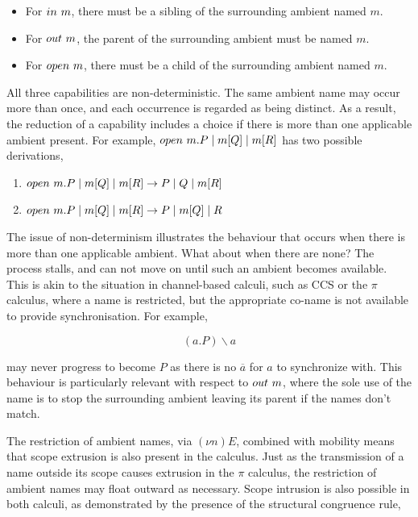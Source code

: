 \begin{itemize}
\item For $in\ m$, there must be a sibling of the surrounding
ambient named $m$.
\item For $out\ m$, the parent of the surrounding ambient must be
named $m$.
\item For $open\ m$, there must be a child of the surrounding
  ambient named $m$.
\end{itemize}

All three capabilities are non-deterministic.  The same ambient name
may occur more than once, and each occurrence is regarded as being
distinct.  As a result, the reduction of a capability includes a
choice if there is more than one applicable ambient present.  For
example, $open\ m.P \;|\; m[Q] \;|\; m[R]$ has two possible
derivations,

\begin{enumerate}
\item $open\ m.P \;|\; m[Q] \;|\; m[R] \rightarrow P \;|\; Q \;|\; m[R]$
\item $open\ m.P \;|\; m[Q] \;|\; m[R] \rightarrow P \;|\; m[Q] \;|\; R$
\end{enumerate}

The issue of non-determinism illustrates the behaviour that occurs when
there is more than one applicable ambient.  What about when there are
none?  The process stalls, and can not move on until such an ambient
becomes available.  This is akin to the situation in channel-based
calculi, such as CCS or the $\pi$ calculus, where a name is restricted,
but the appropriate co-name is not available to provide synchronisation.
For example,

\begin{equation}
(a.P) \backslash a 
\end{equation}

\noindent may never progress to become $P$ as there is no $\overline{a}$
for $a$ to synchronize with.  This behaviour is particularly relevant
with respect to $out\ m$, where the sole use of the name is to stop
the surrounding ambient leaving its parent if the names don't match.

The restriction of ambient names, via $(\nu n) E$, combined with
mobility means that scope extrusion is also present in the calculus.
Just as the transmission of a name outside its scope causes extrusion
in the $\pi$ calculus, the restriction of ambient names may float
outward as necessary.  Scope intrusion is also possible in both
calculi, as demonstrated by the presence of the structural congruence
rule,


